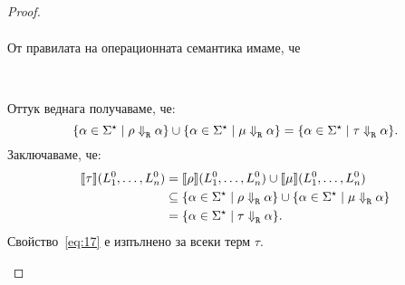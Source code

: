 \begin{proof}
\begin{itemize}
\begin{align*}
    \end{align*}
    От правилата на операционната семантика имаме, че
    \begin{figure}[H]
      \begin{subfigure}[b]{0.5\textwidth}
        \begin{prooftree}
        \end{prooftree}
        \vspace*{2mm}
      \end{subfigure}
      ~
      \begin{subfigure}[b]{0.5\textwidth}
        \begin{prooftree}
        \end{prooftree}
        \vspace*{2mm}
      \end{subfigure}
    \end{figure}
    Оттук веднага получаваме, че:
    \[\{\alpha \in \Sigma^\star \mid \rho \opsem{}{R} \alpha\} \cup \{\alpha \in \Sigma^\star \mid \mu \opsem{}{R} \alpha\} = \{\alpha \in \Sigma^\star \mid \tau \opsem{}{R} \alpha\}.\]
    Заключаваме, че:
    \begin{align*}
      \val{\tau}(L^0_1,\dots,L^0_n) & = \val{\rho}(L^0_1,\dots,L^0_n) \cup \val{\mu}(L^0_1,\dots,L^0_n)\\
                                    & \subseteq \{\alpha \in \Sigma^\star \mid \rho \opsem{}{R} \alpha\} \cup \{\alpha \in \Sigma^\star \mid \mu \opsem{}{R} \alpha\}\\
                                    & = \{\alpha \in \Sigma^\star \mid \tau \opsem{}{R} \alpha\}.
    \end{align*}
    Свойство~\ref{eq:17} е изпълнено за всеки терм $\tau$.
  \end{itemize}


\end{proof}
